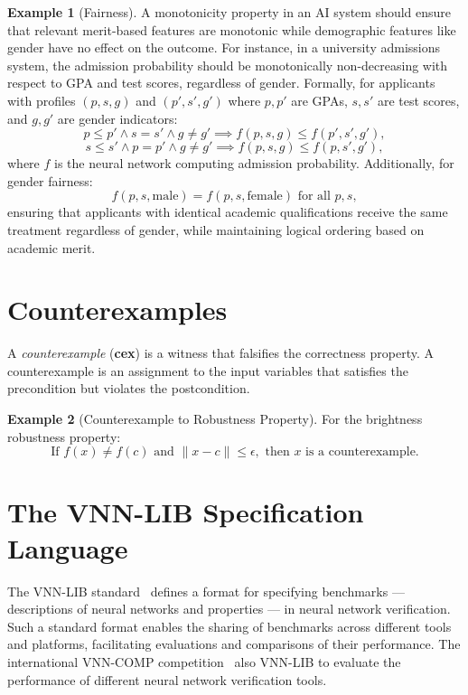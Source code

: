 \documentclass[oneside,11pt,dvipsnames]{book}
\numberwithin{equation}{section}
\theoremstyle{definition}
\newtheorem{example}{Example}[section]
\theoremstyle{remark}
\begin{document}
\begin{example}[Fairness]
    A monotonicity property in an AI system should ensure that relevant merit-based features are monotonic while demographic features like gender have no effect on the outcome. For instance, in a university admissions system, the admission probability should be monotonically non-decreasing with respect to GPA and test scores, regardless of gender. Formally, for applicants with profiles $(p, s, g)$ and $(p', s', g')$ where $p, p'$ are GPAs, $s, s'$ are test scores, and $g, g'$ are gender indicators:
\[
p \leq p' \land s = s' \land g \neq g' \implies f(p, s, g) \leq f(p', s', g'),
\]
\[
s \leq s' \land p = p' \land g \neq g' \implies f(p, s, g) \leq f(p, s', g'),
\]
where $f$ is the neural network computing admission probability. Additionally, for gender fairness:
\[
f(p, s, \text{male}) = f(p, s, \text{female}) \text{ for all } p, s,
\]
ensuring that applicants with identical academic qualifications receive the same treatment regardless of gender, while maintaining logical ordering based on academic merit.
\end{example}



\section{Counterexamples}\label{sec:counterexamples}

A \emph{counterexample} (\textbf{cex}) is a witness that falsifies the correctness property. A counterexample is an assignment to the input variables that satisfies the precondition but violates the postcondition.

\begin{example}[Counterexample to Robustness Property]
For the brightness robustness property:
\[
\text{If } f(x) \neq f(c) \text{ and } \|x - c\| \leq \epsilon, \text{ then } x \text{ is a counterexample.}
\]
\end{example}


\section{The VNN-LIB  Specification Language}


The VNN-LIB standard~\cite{demarchi2023supporting,vnnlib} defines a format for specifying benchmarks --- descriptions of neural networks and properties --- in neural network verification. Such a standard format enables the sharing of benchmarks across different tools and platforms, facilitating evaluations and comparisons of their performance. The international VNN-COMP competition~\cite{brix2024fifth} also VNN-LIB to evaluate the performance of different neural network verification tools.
\end{document}
